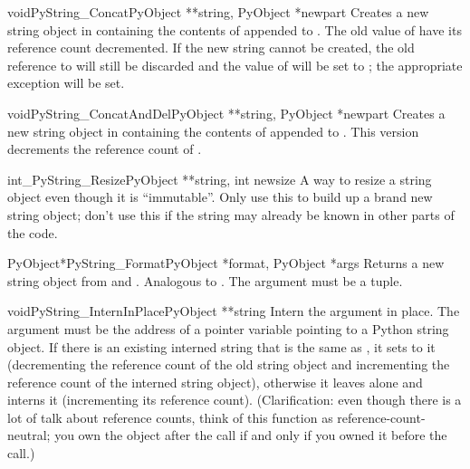 \documentclass{manual}
\begin{document}
\begin{cfuncdesc}{void}{PyString_Concat}{PyObject **string,
                                         PyObject *newpart}
Creates a new string object in  containing the
contents of  appended to .  The old value of
 have its reference count decremented.  If the new string
cannot be created, the old reference to  will still be
discarded and the value of  will be set to
\NULL{}; the appropriate exception will be set.
\end{cfuncdesc}

\begin{cfuncdesc}{void}{PyString_ConcatAndDel}{PyObject **string,
                                               PyObject *newpart}
Creates a new string object in  containing the contents
of  appended to .  This version decrements
the reference count of .
\end{cfuncdesc}

\begin{cfuncdesc}{int}{_PyString_Resize}{PyObject **string, int newsize}
A way to resize a string object even though it is ``immutable''.  
Only use this to build up a brand new string object; don't use this if
the string may already be known in other parts of the code.
\end{cfuncdesc}

\begin{cfuncdesc}{PyObject*}{PyString_Format}{PyObject *format,
                                              PyObject *args}
Returns a new string object from  and .  Analogous
to .  The  argument must be
a tuple.
\end{cfuncdesc}

\begin{cfuncdesc}{void}{PyString_InternInPlace}{PyObject **string}
Intern the argument  in place.  The argument must be the
address of a pointer variable pointing to a Python string object.
If there is an existing interned string that is the same as
, it sets  to it (decrementing the reference 
count of the old string object and incrementing the reference count of
the interned string object), otherwise it leaves  alone
and interns it (incrementing its reference count).  (Clarification:
even though there is a lot of talk about reference counts, think of
this function as reference-count-neutral; you own the object after
the call if and only if you owned it before the call.)
\end{cfuncdesc}
\end{document}
